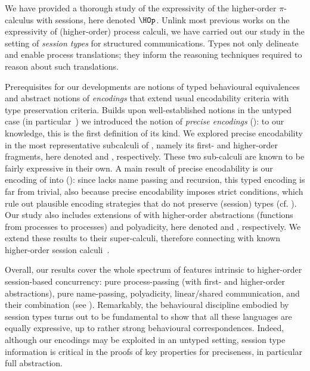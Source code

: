 
We have provided a thorough study of the expressivity of the higher-order $\pi$-calculus with sessions, here denoted $\HOp$.
Unlink most previous works on the expressivity of 
(higher-order) process calculi, we have carried out our study in the setting of \emph{session types} for structured communications.
Types not only delineate and enable process translations; they 
inform the reasoning techniques required to reason about such translations.

Prerequisites for our developments are notions of typed behavioural equivalences and abstract notions of 
\emph{encodings} that extend usual encodability criteria with type preservation criteria. 
Builds upon well-established notions in the untyped case (in particular~\cite{DBLP:journals/iandc/Gorla10})
we introduced the notion of \emph{precise  encodings} ():
to our knowledge, this is the first definition of its kind. We explored precise encodability in the most representative subcalculi of \HOp, 
namely its first- and higher-order fragments, here denoted \sessp and \HO, respectively. These two sub-calculi are known to be fairly expressive in their own. A main result of precise encodability is our encoding of \HOp into \HO ():
since \HO lacks name passing and recursion, this typed encoding is far from trivial, also because precise encodability imposes strict conditions, which rule out plausible encoding strategies that do not preserve (session) types (cf. ). Our study also includes extensions of \HOp with higher-order abstractions (functions from processes to processes) and polyadicity, here denoted \HOpp and \PHOp, respectively. We extend these results to their super-calculi, therefore connecting with known higher-order session calculi~\cite{tlca07}.

Overall, 
our results cover the whole spectrum of features intrinsic to higher-order session-based concurrency:
pure process-passing (with first- and higher-order abstractions), pure name-passing, polyadicity, 
linear/shared communication, and their combination (see ). Remarkably, 
the behavioural discipline embodied by 
session types turns out to be fundamental to show that all these languages are equally expressive, up to 
rather strong behavioural correspondences. Indeed, although our encodings may be exploited in an untyped setting,
session type information is critical in the proofs of key properties for preciseness, in particular full abstraction.
